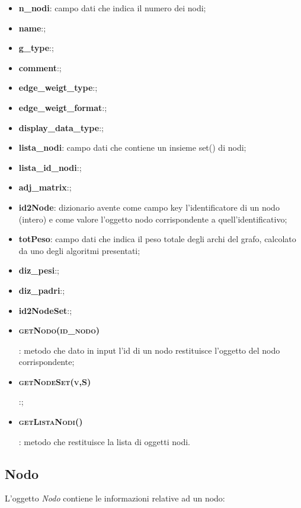 \begin{itemize}
    \item \textbf{n\_nodi}: campo dati che indica il numero dei nodi;
    \item \textbf{name}:;
    \item \textbf{g\_type}:;
    \item \textbf{comment}:;
    \item \textbf{edge\_weigt\_type}:;
    \item \textbf{edge\_weigt\_format}:;
    \item \textbf{display\_data\_type}:;
    \item \textbf{lista\_nodi}: campo dati che contiene un insieme set() di nodi; 
    \item \textbf{lista\_id\_nodi}:;
    \item \textbf{adj\_matrix}:;
    \item \textbf{id2Node}: dizionario avente come campo key l'identificatore di un nodo (intero) e come valore l'oggetto nodo corrispondente a quell'identificativo;
    \item \textbf{totPeso}: campo dati che indica il peso totale degli archi del grafo, calcolato da uno degli algoritmi presentati;
    \item \textbf{diz\_pesi}:;
    \item \textbf{diz\_padri}:;
    \item \textbf{id2NodeSet}:;
    \item \hypertarget{getnodo}{\textbf{\textsc{getNodo(id\_nodo)}}}: metodo che dato in input l'id di un nodo restituisce l'oggetto del nodo corrispondente;
    \item \hypertarget{getnodeset}{\textbf{\textsc{getNodeSet(v,S)}}}:;
    \item \hypertarget{getlistanodi}{\textbf{\textsc{getListaNodi()}}}: metodo che restituisce la lista di  oggetti nodi.
\end{itemize}


\subsection{Nodo}
\label{nodo}

L'oggetto \textit{Nodo} contiene le informazioni relative ad un nodo:

